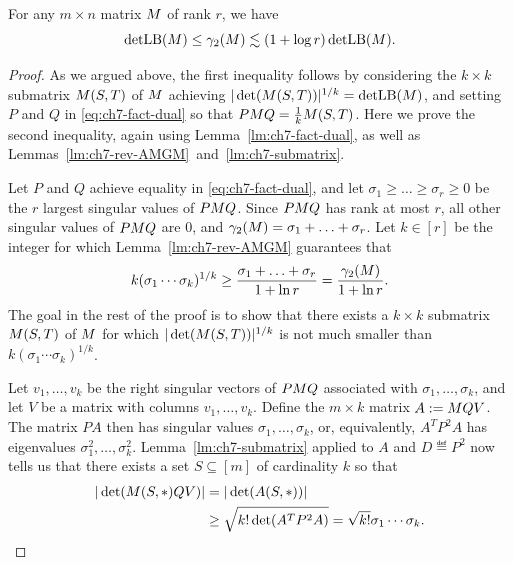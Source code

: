 \begin{lemma}\label{lm:ch7-fact-detlb}
  For any $m\times n$ matrix $M$ of rank $r$, we have
  \[
    \operatorname{detLB}(M) \le \gamma_2(M) \lesssim (1 + \log r) \operatorname{detLB}(M).
  \]
\end{lemma}
\begin{proof}
  As we argued above, the first inequality follows by considering the
  $k\times k$ submatrix $M(S,T)$ of $M$ achieving
  $|\det(M(S,T))|^{1/k} = \operatorname{detLB}(M)$, and setting $P$ and $Q$ in
  \eqref{eq:ch7-fact-dual} so that $PM Q = \frac1k M(S,T)$.
  Here we prove the second inequality, again using
  Lemma~\ref{lm:ch7-fact-dual}, as well as
  Lemmas~\ref{lm:ch7-rev-AMGM}~and~\ref{lm:ch7-submatrix}.

  Let $P$ and $Q$ achieve equality in \eqref{eq:ch7-fact-dual}, and
  let $\sigma_1 \ge \ldots \ge \sigma_r \ge 0$ be the $r$ largest singular
  values of $P M Q$. Since $P M Q$ has rank at most $r$, all
  other singular values of $P M Q$ are $0$, and $\gamma_2(M) =
  \sigma_1 + \ldots + \sigma_r$. Let $k \in [r]$ be the integer for
  which Lemma~\ref{lm:ch7-rev-AMGM} guarantees that
  \begin{equation}\label{eq:ch7-top-k}
    k(\sigma_1 \cdots \sigma_k)^{1/k}
    \ge \frac{\sigma_1 + \ldots + \sigma_r}{1+\ln r}
    = \frac{\gamma_2(M)}{1+\ln r}.
  \end{equation}
  The goal in the rest of the proof is to show that there exists a
  $k\times k$ submatrix $M(S,T)$ of $M$ for which $|\det(M(S,T))|^{1/k}$ is not
  much smaller than $k(\sigma_1 \cdots \sigma_k)^{1/k}$.

  Let $v_1, \ldots, v_k$ be the right singular vectors of $P M Q$
  associated with $\sigma_1, \ldots, \sigma_k$, and let $V$ be a
  matrix with columns $v_1, \ldots, v_k$. Define the $m\times k$
  matrix $A := M QV$. The matrix $PA$ then has singular values
  $\sigma_1, \ldots, \sigma_k$, or, equivalently, $A^TP^2A$ has
  eigenvalues $\sigma_1^2, \ldots,
  \sigma_k^2$. Lemma~\ref{lm:ch7-submatrix} applied to $A$ and $D
  \eqdef P^2$ now tells us that there exists a set $S \subseteq [m]$
  of cardinality $k$ so that
  \begin{align}
    |\det(M(S,*)QV)| &= |\det(A(S,*))|\notag\\
    &\ge \sqrt{k! \det(A^TP^2A)} = \sqrt{k!} \sigma_1 \cdots \sigma_k.    \label{eq:ch7-rows}
  \end{align}


\end{proof}
